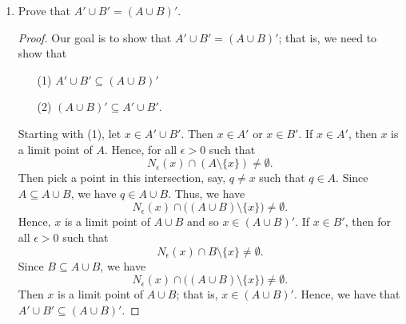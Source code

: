 \documentclass[a4paper]{article}
\begin{document}
\begin{enumerate}
\begin{enumerate}
\begin{proof}
                Our goal is to show that \( \overline{A \cap B} \subseteq \overline{A} \cap \overline{B} \). Let \( x \in \overline{A \cap B} \). Then either \( x \in A \cap B  \) or \( x \in (A \cap B)' \). Suppose \( x \in A \cap  B  \). Then both \( x \in A  \) and \( x \in  B \) and so \( x \in \overline{A} \) and \( x \in \overline{B} \) since \( A \subseteq  \overline{A} \) and \( B \subseteq \overline{B} \). Now, suppose \( x \in (A \cap B)' \). Then \( x  \) is a limit point of \( A \cap B  \); that is, for all \( \epsilon > 0  \), \( {N}_{\epsilon}(x) \cap ((A \cap B) \setminus  \{ x \} ) \neq \emptyset \). Since \( A \cap B \subseteq  A  \) and \( A \cap B \subseteq  B  \), we must have that
                \[  {N}_{\epsilon}(x) \cap (A \setminus  \{ x \} ) \neq \emptyset  \tag{1}\]
                and 
                \[  {N}_{\epsilon}(x) \cap (B \setminus  \{ x \} ) \neq \emptyset. \tag{2}  \]
                Thus, (1) and (2) imply that \( x \in A'   \) and \( x \in B'  \) meaning that \( x  \) is both a limit of point of \( A  \) and \(  B \). Hence, \( x \in \overline{A}  \) and \( x \in \overline{B} \). Thus, we have \( \overline{A \cap B} \subseteq \overline{A} \cap \overline{B} \) in both of these cases.
                \end{proof}
            \item Prove that \( A' \cup B' = (A \cup B)' \).
                \begin{proof}
                Our goal is to show that \( A' \cup B' = (A \cup B)' \); that is, we need to show that
                \begin{enumerate}
                    \item[(1)] \( A' \cup B' \subseteq  (A \cup B)' \)
                    \item[(2)] \( (A \cup B)' \subseteq  A' \cup B' \).
                \end{enumerate}
                Starting with (1), let \( x \in A' \cup B' \). Then \( x \in A' \) or \( x \in B' \). If \( x \in A' \), then \( x  \) is a limit point of \( A  \). Hence, for all \( \epsilon > 0  \) such that 
                \[  {N}_{\epsilon}(x) \cap (A \setminus  \{ x \}) \neq \emptyset. \]
                Then pick a point in this intersection, say, \( q \neq x  \) such that \( q \in A  \). Since \( A \subseteq  A \cup B  \), we have \( q \in A \cup B \). Thus, we have 
                \[  {N}_{\epsilon}(x) \cap \Big( (A \cup  B) \setminus  \{ x \} \Big) \neq \emptyset. \]
                Hence, \( x  \) is a limit point of \( A \cup B \) and so \( x \in (A \cup B)' \). If \( x \in B' \), then for all \( \epsilon > 0  \) such that  
                \[  {N}_{\epsilon}(x) \cap B \setminus  \{ x \} \neq \emptyset.  \]
                Since \( B \subseteq A \cup B \), we have
                \[  {N}_{\epsilon}(x) \cap \Big( (A \cup B) \setminus  \{ x \} \Big) \neq \emptyset. \]
                Then \( x  \) is a limit point of \( A \cup B \); that is, \( x \in (A \cup B)' \). Hence, we have that \( A' \cup B' \subseteq  (A \cup B)' \).


\end{proof}
\end{enumerate}
\end{enumerate}
\end{document}
